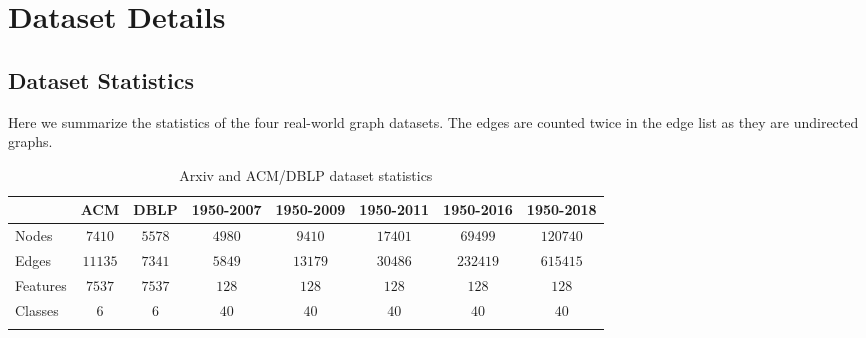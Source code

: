 \section{Dataset Details}

\label{app:dataset}

\subsection{Dataset Statistics} 
Here we summarize the statistics of the four real-world graph datasets.
The edges are counted twice in the edge list as they are undirected graphs. 

\begin{table}[h!]
\caption{Arxiv and ACM/DBLP dataset statistics}
\vspace{2mm}
\begin{center}
\begin{tabular}{lccccccc}
\toprule
            & ACM          & DBLP           & 1950-2007         &1950-2009  &1950-2011  &1950-2016          &1950-2018 \\
\midrule
Nodes          & $7410$  & $5578$ & $4980$ &  $9410$  &$17401$  & $69499$ & $120740$ \\
Edges        & $11135    $ & $7341$ & $5849$    &$13179$   &    $30486$     & $232419$ & $615415$ \\
Features    & $7537    $ & $7537  $ & $128$   &    $128$  & $128$   &    $128$   &    $128$   \\
Classes        & $6    $ & $6  $ & $40$    &$40$  & $40$    &$40$     &    $40$ \\
\bottomrule
\label{table:arxiv_datastats}
\end{tabular}
\end{center}
\vskip -0.7cm
\end{table}


